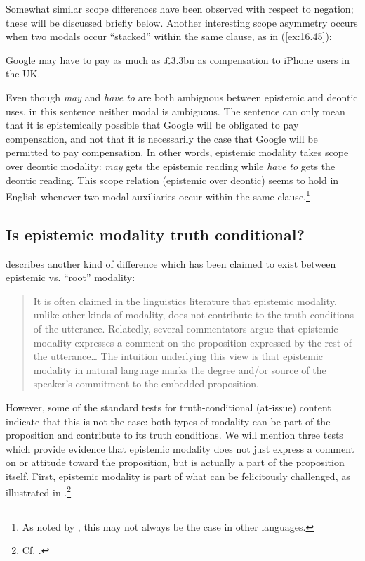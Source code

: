 Somewhat similar scope differences have been observed with respect to negation; these will be discussed briefly below. Another interesting scope asymmetry occurs when two modals occur “stacked” within the same clause, as in (\ref{ex:16.45}):


\ea \label{ex:16.45}
Google may have to pay as much as £3.3bn as compensation to iPhone users in the UK.\\
\z


Even though \textit{may} and \textit{have to} are both ambiguous between epistemic and deontic uses, in this sentence neither modal is ambiguous. The sentence can only mean that it is epistemically possible that Google will be obligated to pay compensation, and not that it is necessarily the case that Google will be permitted to pay compensation. In other words, epistemic modality takes scope over deontic modality: \textit{may} gets the epistemic reading while \textit{have to} gets the deontic reading. This scope relation (epistemic over deontic) seems to hold in English whenever two modal auxiliaries occur within the same clause.\footnote{As noted by \citet{Hacquard2011}, this may not always be the case in other languages.}


\subsection{Is epistemic modality truth conditional?}\label{sec:16.5.2}


\citet[1688]{Papafragou2006} describes another kind of difference which has been claimed to exist between epistemic vs. “root” modality:


\begin{quote}
It is often claimed in the linguistics literature that epistemic modality, unlike other kinds of modality, does not contribute to the truth conditions of the utterance. Relatedly, several commentators argue that epistemic modality expresses a comment on the proposition expressed by the rest of the utterance…  The intuition underlying this view is that epistemic modality in natural language marks the degree and/or source of the speaker’s commitment to the embedded proposition.
\end{quote}


However, some of the standard tests for truth-conditional (at-issue) content indicate that this is not the case: both types of modality can be part of the proposition and contribute to its truth conditions. We will mention three tests which provide evidence that epistemic modality does not just express a comment on or attitude toward the proposition, but is actually a part of the proposition itself. First, epistemic modality is part of what can be felicitously challenged, as illustrated in .\footnote{Cf. \citet[1698]{Papafragou2006}.}


